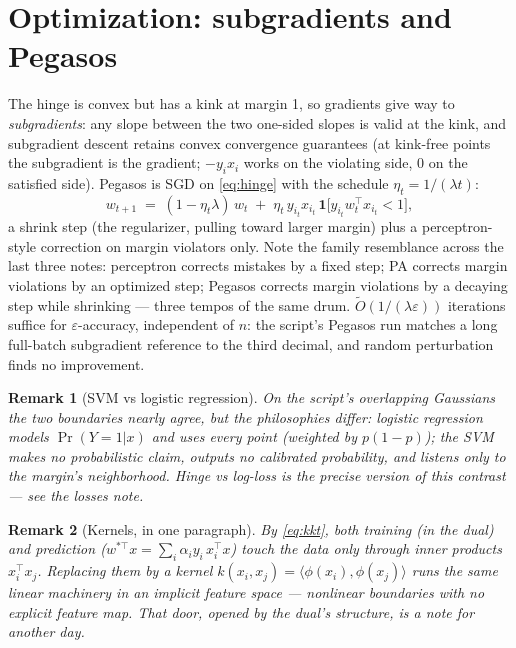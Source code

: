 \documentclass[11pt]{article}
\newtheorem{remark}{Remark}
\begin{document}
\section{Optimization: subgradients and Pegasos}

The hinge is convex but has a kink at margin 1, so gradients give way to
\emph{subgradients}: any slope between the two one-sided slopes is valid
at the kink, and subgradient descent retains convex convergence
guarantees (at kink-free points the subgradient is the gradient;
$-y_i x_i$ works on the violating side, $0$ on the satisfied side).
Pegasos is SGD on \eqref{eq:hinge} with the schedule
$\eta_t = 1/(\lambda t)$:
\begin{equation}
  w_{t+1} \;=\; (1 - \eta_t\lambda)\, w_t
  \;+\; \eta_t\, y_{i_t} x_{i_t}\,
  \mathbf{1}\bigl[y_{i_t} w_t^\top x_{i_t} < 1\bigr] ,
  \label{eq:pegasos}
\end{equation}
a shrink step (the regularizer, pulling toward larger margin) plus a
perceptron-style correction on margin violators only. Note the family
resemblance across the last three notes: perceptron corrects mistakes by
a fixed step; PA corrects margin violations by an optimized step; Pegasos
corrects margin violations by a decaying step while shrinking --- three
tempos of the same drum. $\tilde O(1/(\lambda\varepsilon))$ iterations
suffice for $\varepsilon$-accuracy, independent of $n$: the script's
Pegasos run matches a long full-batch subgradient reference to the third
decimal, and random perturbation finds no improvement.

\begin{remark}[SVM vs logistic regression]
On the script's overlapping Gaussians the two boundaries nearly agree,
but the philosophies differ: logistic regression models
$\Pr(Y{=}1|x)$ and uses \emph{every} point (weighted by $p(1-p)$); the
SVM makes no probabilistic claim, outputs no calibrated probability, and
listens only to the margin's neighborhood. Hinge vs log-loss is the
precise version of this contrast --- see the losses note.
\end{remark}

\begin{remark}[Kernels, in one paragraph]
By \eqref{eq:kkt}, both training (in the dual) and prediction
($w^{\ast\top}x = \sum_i \alpha_i y_i\, x_i^\top x$) touch the data only
through inner products $x_i^\top x_j$. Replacing them by a kernel
$k(x_i, x_j) = \langle\phi(x_i),\phi(x_j)\rangle$ runs the same linear
machinery in an implicit feature space --- nonlinear boundaries with no
explicit feature map. That door, opened by the dual's structure, is a
note for another day.
\end{remark}
\end{document}
